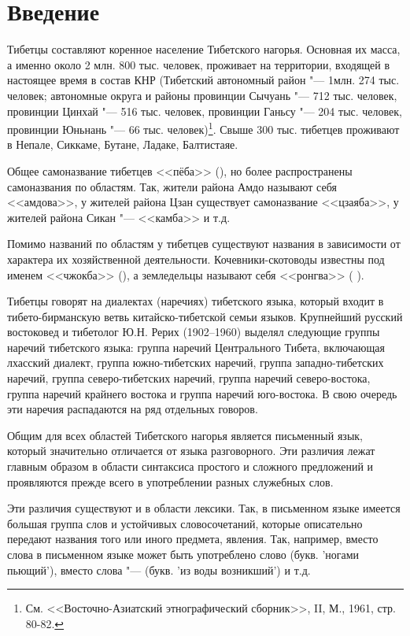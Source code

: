 \chapter{Введение}

Тибетцы составляют коренное население Тибетского нагорья. Основная их масса, а именно около 2 млн. 800 тыс. человек, проживает на территории, входящей в настоящее время в состав КНР (Тибетский автономный район "--- 1млн. 274 тыс. человек; автономные округа и районы провинции Сычуань "--- 712 тыс. человек, провинции Цинхай "--- 516 тыс. человек, провинции Ганьсу "--- 204 тыс. человек, провинции Юньнань "--- 66 тыс. человек)\footnote[1]{См. <<Восточно-Азиатский этнографический сборник>>, II, М., 1961, стр. 80-82.}. Свыше 300 тыс. тибетцев проживают в Непале, Сиккаме, Бутане, Ладаке, Балтистаяе.

Общее самоназвание тибетцев <<пёба>> (), но более распространены самоназвания по областям. Так, жители района Амдо называют себя <<амдова>>, у жителей района Цзан существует самоназвание <<цзаяба>>, у жителей района Сикан "--- <<камба>> и т.д.

Помимо названий по областям у тибетцев существуют названия в зависимости от характера их хозяйственной деятельности. Кочевники-скотоводы известны под именем <<чжокба>> (), а земледельцы называют себя <<ронгва>> ( ).

Тибетцы говорят на диалектах (наречиях) тибетского языка, который входит в тибето-бирманскую ветвь китайско-тибетской семьи языков. Крупнейший русский востоковед и тибетолог Ю.Н. Рерих (1902--1960) выделял следующие группы наречий тибетского языка: группа наречий Центрального Тибета, включающая лхасский диалект, группа южно-тибетских наречий, группа западно-тибетских наречий, группа северо-тибетских наречий, группа наречий северо-востока, группа наречий крайнего востока и группа наречий юго-востока. В свою очередь эти наречия распадаются на ряд отдельных говоров.

Общим для всех областей Тибетского нагорья является письменный язык, который значительно отличается от языка разговорного. Эти различия лежат главным образом в области синтаксиса простого и сложного предложений и проявляются прежде всего в употреблении разных служебных слов.

Эти различия существуют и в области лексики. Так, в письменном языке имеется большая группа слов и устойчивых словосочетаний, которые описательно передают названия того или иного предмета, явления. Так, например, вместо слова  в письменном языке может быть употреблено слово  (букв. 'ногами пьющий'), вместо слова   "---  (букв. 'из воды возникший') и т.д.

